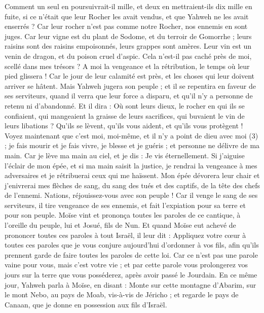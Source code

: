 \begin{multicols}{2}
Comment un seul en poursuivrait-il mille, et deux en mettraient-ils dix mille en fuite, si ce n'était que leur Rocher les avait vendus, et que Yahweh ne les avait enserrés ?
Car leur rocher n'est pas comme notre Rocher, nos ennemis en sont juges.
Car leur vigne est du plant de Sodome, et du terroir de Gomorrhe ; leurs raisins sont des raisins empoisonnés, leurs grappes sont amères.
Leur vin est un venin de dragon, et du poison cruel d'aspic.
Cela n'est-il pas caché près de moi, scellé dans mes trésors ?
A moi la vengeance et la rétribution, le temps où leur pied glissera ! Car le jour de leur calamité est près, et les choses qui leur doivent arriver se hâtent.
Mais Yahweh jugera son peuple ; et il se repentira en faveur de ses serviteurs, quand il verra que leur force a disparu, et qu'il n'y a personne de retenu ni d’abandonné.
Et il dira : Où sont leurs dieux, le rocher en qui ils se confiaient,
qui mangeaient la graisse de leurs sacrifices, qui buvaient le vin de leurs libations ? Qu'ils se lèvent, qu'ils vous aident, et qu'ils vous protègent !
Voyez maintenant que c'est moi, moi-même, et il n'y a point de dieu avec moi (3) ; je fais mourir et je fais vivre, je blesse et je guéris ; et personne ne délivre de ma main.
Car je lève ma main au ciel, et je dis : Je vis éternellement.
Si j'aiguise l’éclair de mon épée, et si ma main saisit la justice, je rendrai la vengeance à mes adversaires et je rétribuerai ceux qui me haïssent.
Mon épée dévorera leur chair et j'enivrerai mes flèches de sang, du sang des tués et des captifs, de la tête des chefs de l’ennemi.
Nations, réjouissez-vous avec son peuple ! Car il venge le sang de ses serviteurs, il tire vengeance de ses ennemis, et fait l'expiation pour sa terre et pour son peuple.
Moïse vint et prononça toutes les paroles de ce cantique, à l’oreille du peuple, lui et Josué, fils de Nun.
Et quand Moïse eut achevé de prononcer toutes ces paroles à tout Israël,
il leur dit : Appliquez votre cœur à toutes ces paroles que je vous conjure aujourd'hui d’ordonner à vos fils, afin qu'ils prennent garde de faire toutes les paroles de cette loi.
Car ce n'est pas une parole vaine pour vous, mais c'est votre vie ; et par cette parole vous prolongerez vos jours sur la terre que vous posséderez, après avoir passé le Jourdain.
En ce même jour, Yahweh parla à Moïse, en disant :
Monte sur cette montagne d’Abarim, sur le mont Nebo, au pays de Moab, vis-à-vis de Jéricho ; et regarde le pays de Canaan, que je donne en possession aux fils d'Israël.

\end{multicols}
